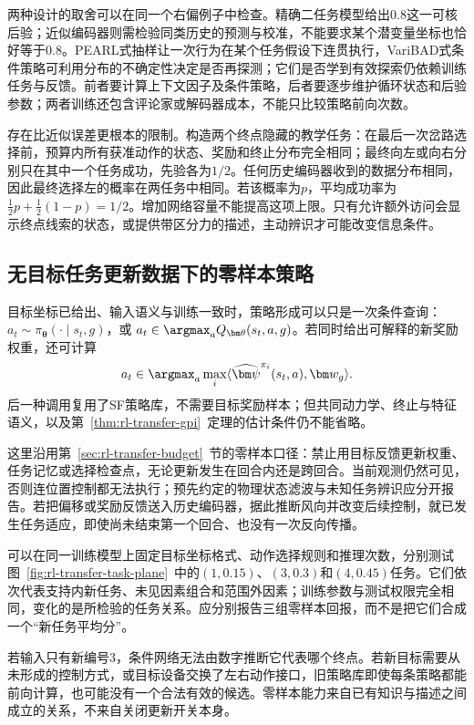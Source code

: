 两种设计的取舍可以在同一个右偏例子中检查。精确二任务模型给出$0.8$这一可核后验；近似编码器则需检验同类历史的预测与校准，不能要求某个潜变量坐标也恰好等于$0.8$。PEARL式抽样让一次行为在某个任务假设下连贯执行，VariBAD式条件策略可利用分布的不确定性决定是否再探测；它们是否学到有效探索仍依赖训练任务与反馈。前者要计算上下文因子及条件策略，后者要逐步维护循环状态和后验参数；两者训练还包含评论家或解码器成本，不能只比较策略前向次数。

存在比近似误差更根本的限制。构造两个终点隐藏的教学任务：在最后一次岔路选择前，预算内所有获准动作的状态、奖励和终止分布完全相同；最终向左或向右分别只在其中一个任务成功，先验各为$1/2$。任何历史编码器收到的数据分布相同，因此最终选择左的概率在两任务中相同。若该概率为$p$，平均成功率为$\tfrac12p+\tfrac12(1-p)=1/2$。增加网络容量不能提高这项上限。只有允许额外访问会显示终点线索的状态，或提供带区分力的描述，主动辨识才可能改变信息条件。

\subsection{无目标任务更新数据下的零样本策略}
\label{sec:rl-transfer-zero-shot}

目标坐标已给出、输入语义与训练一致时，策略形成可以只是一次条件查询：
$a_t\sim\pi_{\bm\theta}(\cdot\mid s_t,g)$，或
$a_t\in\argmax_a Q_{\bm\theta}(s_t,a,g)$。若同时给出可解释的新奖励权重，还可计算
\[
 a_t\in\argmax_a\max_i
 \langle\widehat{\bm\psi}^{\pi_i}(s_t,a),\bm w_g\rangle.
\]
后一种调用复用了SF策略库，不需要目标奖励样本；但共同动力学、终止与特征语义，以及第~\ref{thm:rl-transfer-gpi}~定理的估计条件仍不能省略。

这里沿用第~\ref{sec:rl-transfer-budget}~节的零样本口径：禁止用目标反馈更新权重、任务记忆或选择检查点，无论更新发生在回合内还是跨回合。当前观测仍然可见，否则连位置控制都无法执行；预先约定的物理状态滤波与未知任务辨识应分开报告。若把偏移或奖励反馈送入历史编码器，据此推断风向并改变后续控制，就已发生任务适应，即使尚未结束第一个回合、也没有一次反向传播。

可以在同一训练模型上固定目标坐标格式、动作选择规则和推理次数，分别测试图~\ref{fig:rl-transfer-task-plane}~中的$(1,0.15)$、$(3,0.3)$和$(4,0.45)$任务。它们依次代表支持内新任务、未见因素组合和范围外因素；训练参数与测试权限完全相同，变化的是所检验的任务关系。应分别报告三组零样本回报，而不是把它们合成一个“新任务平均分”。

若输入只有新编号3，条件网络无法由数字推断它代表哪个终点。若新目标需要从未形成的控制方式，或目标设备交换了左右动作接口，旧策略库即使每条策略都能前向计算，也可能没有一个合法有效的候选。零样本能力来自已有知识与描述之间成立的关系，不来自关闭更新开关本身。

